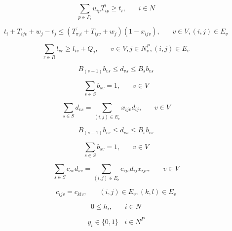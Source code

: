 \documentclass[a4paper,12pt]{article}
\begin{document}
\begin{equation} \label{eq:15}
    \sum_{p\in P_i} u_{ip}\overline{T_{ip}} \geq t_{i}, ~~~~~~~~ i\in N
\end{equation}

\begin{equation} \label{eq:15}
    t_{i} + T_{ijv} + w_j - t_{j} \leq (\overline{T_{\pi_i i}} + T_{ijv} + w_j)(1 - x_{ijv}), ~~~~~~~~ v \in V, (i,j) \in E_v
\end{equation}

\begin{equation} \label{eq:18}
    \sum_{r \in R}l_{vr} \geq l_{iv} + Q_j,~~~~~~~~ v \in V, j\in N_v^P, (i,j)\in E_v
\end{equation}

\begin{equation} \label{eq:19}
    B_{(s-1)}b_{vs} \leq d_{vs} \leq B_sb_{vs}
\end{equation}

\begin{equation} \label{eq:20}
 \sum_{s \in S} b_{sv} = 1 ,~~~~~~~~ v \in V
\end{equation}


\begin{equation} \label{eq:18}
    \sum_{s \in S}d_{vs} = \sum_{(i,j) \in E_v} x_{ijv}d_{ij},~~~~~~~~ v \in V
\end{equation}

\begin{equation} \label{eq:19}
    B_{(s-1)}b_{vs} \leq d_{vs} \leq B_sb_{vs}
\end{equation}

\begin{equation} \label{eq:20}
 \sum_{s \in S} b_{sv} = 1 ,~~~~~~~~ v \in V
\end{equation}

\begin{equation} \label{eq:20}
    \sum_{s \in S} c_{sv}d_{sv} = \sum_{(i,j) \in E_v} c_{ijv}d_{ij}x_{ijv} ,~~~~~~~~ v \in V
\end{equation}

\begin{equation} \label{eq:14}
    c_{ijv} = c_{klv}, ~~~~~~~~ (i, j) \in E_v, (k, l) \in E_v
\end{equation}


\begin{equation} \label{eq:14}
0 \leq h_{i}, ~~~~~~~~ i \in N
\end{equation}

\begin{equation} \label{eq:21}
y_i \in \{0, 1\} ~~~~ i \in N^P
\end{equation}
\end{document}
